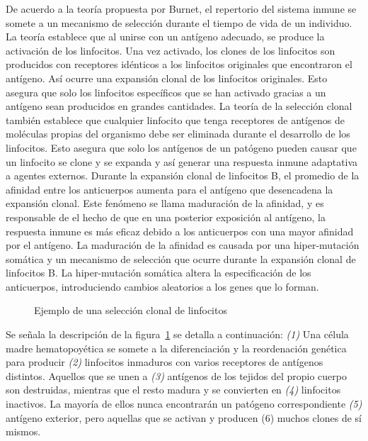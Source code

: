 De acuerdo a la teoría propuesta por Burnet, el repertorio del sistema inmune se somete a un mecanismo de selección durante el tiempo de vida de un individuo.
La teoría establece que al unirse con un antígeno adecuado, se produce la activación de los linfocitos.
Una vez activado, los clones de los linfocitos son producidos con receptores idénticos a los linfocitos originales que encontraron el antígeno.
Así ocurre una expansión clonal de los linfocitos originales.
Esto asegura que solo los linfocitos específicos que se han activado gracias a un antígeno sean producidos en grandes cantidades.
La teoría de la selección clonal también establece que cualquier linfocito que tenga receptores de antígenos de moléculas propias del organismo
debe ser eliminada durante el desarrollo de los linfocitos.
Esto asegura que solo los antígenos de un patógeno pueden causar que un linfocito se clone y se expanda y así generar una respuesta inmune adaptativa a
agentes externos.
Durante la expansión clonal de linfocitos B, el promedio de la afinidad entre los anticuerpos aumenta para el antígeno que desencadena la expansión clonal.
Este fenómeno se llama maduración de la afinidad, y es responsable de el hecho de que en una posterior exposición al antígeno, la respuesta inmune es más eficaz debido a los anticuerpos con una mayor afinidad por el antígeno.
La maduración de la afinidad es causada por una hiper-mutación somática y un mecanismo de selección que ocurre durante la expansión clonal de linfocitos B.
La hiper-mutación somática altera la especificación de los anticuerpos, introduciendo cambios aleatorios a los genes que lo forman.
\begin{figure}[h!]
\begin{center}
\end{center}
\caption{Ejemplo de una selección clonal de linfocitos}
\label{fig:clonalSelection}
\end{figure}

Se señala la descripción de la figura~\ref{fig:clonalSelection} se detalla a continuación:
\emph{(1)} Una célula madre hematopoyética se somete a la diferenciación y
la reordenación genética para producir \emph{(2)} linfocitos inmaduros con
varios receptores de antígenos distintos.
Aquellos que se unen a \emph{(3)} antígenos de los tejidos del propio cuerpo
son destruidas, mientras que el resto madura y se convierten en \emph{(4)} linfocitos
inactivos. La mayoría de ellos nunca encontrarán un patógeno correspondiente \emph{(5)}
antígeno exterior, pero aquellas que se activan y producen (6) muchos clones de sí mismos.

